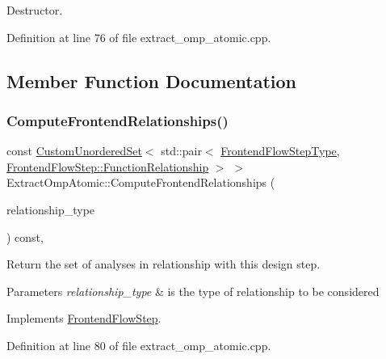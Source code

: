 Destructor. 



Definition at line 76 of file extract\+\_\+omp\+\_\+atomic.\+cpp.



\subsection{Member Function Documentation}
\mbox{\label{classExtractOmpAtomic_a4d219d130ec92a7fdfea32a4b7df167a}} 
\subsubsection{\texorpdfstring{Compute\+Frontend\+Relationships()}{ComputeFrontendRelationships()}}
{\footnotesize\ttfamily const \hyperlink{classCustomUnorderedSet}{Custom\+Unordered\+Set}$<$ std\+::pair$<$ \hyperlink{frontend__flow__step_8hpp_afeb3716c693d2b2e4ed3e6d04c3b63bb}{Frontend\+Flow\+Step\+Type}, \hyperlink{classFrontendFlowStep_af7cf30f2023e5b99e637dc2058289ab0}{Frontend\+Flow\+Step\+::\+Function\+Relationship} $>$ $>$ Extract\+Omp\+Atomic\+::\+Compute\+Frontend\+Relationships (\begin{DoxyParamCaption}\item[{const \hyperlink{classDesignFlowStep_a723a3baf19ff2ceb77bc13e099d0b1b7}{Design\+Flow\+Step\+::\+Relationship\+Type}}]{relationship\+\_\+type }\end{DoxyParamCaption}) const\hspace{0.3cm}{\ttfamily [protected]}, {\ttfamily [virtual]}}



Return the set of analyses in relationship with this design step. 


\begin{DoxyParams}{Parameters}
{\em relationship\+\_\+type} & is the type of relationship to be considered \\
\hline
\end{DoxyParams}


Implements \hyperlink{classFrontendFlowStep_abeaff70b59734e462d347ed343dd700d}{Frontend\+Flow\+Step}.



Definition at line 80 of file extract\+\_\+omp\+\_\+atomic.\+cpp.



